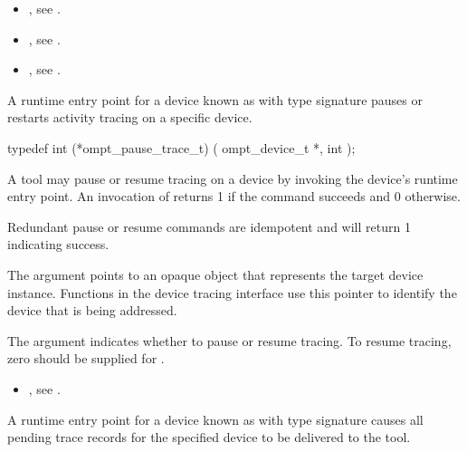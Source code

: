 \crossreferences
\begin{itemize}
\item {},
see .
\item {},
see .
\item {},
see .
\end{itemize}

\label{sec:ompt_pause_trace_t}

\summary
A runtime entry point for a device known as 
with type signature 
pauses or restarts activity tracing on a specific device.

\begin{ccppspecific}
\begin{omptInquiry}
typedef int (*ompt_pause_trace_t) (
  ompt_device_t *,
  int 
);
\end{omptInquiry}
\end{ccppspecific}

\descr

A tool may pause or resume tracing on a device by invoking the device's
 runtime entry point.
An invocation of  returns 1 if the command
succeeds and 0 otherwise.

Redundant pause or resume commands are idempotent and will
return 1 indicating success.

\argdesc
The  argument points to an opaque object that represents
the target device instance. Functions in the device tracing interface
use this pointer to identify the device that is being addressed.

The argument  indicates whether to pause or
resume tracing.
To resume tracing, zero should be supplied for .

\crossreferences
\begin{itemize}
\item {},
see .
\end{itemize}

\label{sec:ompt_flush_trace_t}

\summary
A runtime entry point for a device known as 
with type signature  causes all pending trace 
records for the specified device to be delivered to the tool.

